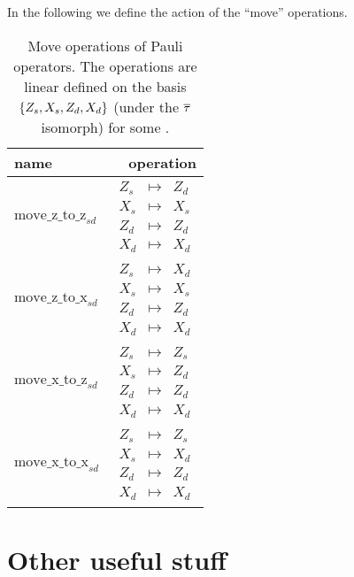 \documentclass[a4paper,english]{scrartcl}
\begin{document}
\begin{definition}
In the following we define the action of the ``move'' operations.
\begin{table}[H]\label{t"move_operations}
\center
\caption[Move operations of Pauli operators]{Move operations of Pauli operators. The
operations are linear defined on the basis $\bc{Z_s, X_s, Z_d, X_d}$ (under the $\overline{\tau}$
isomorph) for some \en[s, d].}
\begin{tabular}{lr}
  \toprule
  name & operation\\
  \midrule
  $\mathrm{move\_z\_to\_z}_{sd}$ & $\begin{array}{ccc}
    Z_s&\mapsto&Z_d\\X_s&\mapsto&X_s\\Z_d&\mapsto&Z_d\\X_d&\mapsto&X_d\end{array}$\\
  \midrule
  $\mathrm{move\_z\_to\_x}_{sd}$ & $\begin{array}{ccc}
    Z_s&\mapsto&X_d\\X_s&\mapsto&X_s\\Z_d&\mapsto&Z_d\\X_d&\mapsto&X_d\end{array}$\\
  \midrule
  $\mathrm{move\_x\_to\_z}_{sd}$ & $\begin{array}{ccc}
    Z_s&\mapsto&Z_s\\X_s&\mapsto&Z_d\\Z_d&\mapsto&Z_d\\X_d&\mapsto&X_d\end{array}$\\
  \midrule
  $\mathrm{move\_x\_to\_x}_{sd}$ & $\begin{array}{ccc}
    Z_s&\mapsto&Z_s\\X_s&\mapsto&X_d\\Z_d&\mapsto&Z_d\\X_d&\mapsto&X_d\end{array}$\\
  \bottomrule
\end{tabular}
\end{table}
\end{definition}

\appendix

\section{Other useful stuff}
\end{document}
